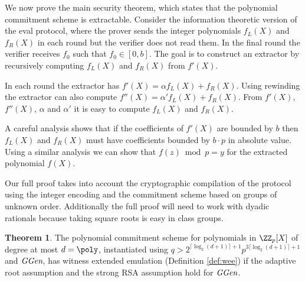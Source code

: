 \documentclass{article}
\theoremstyle{definition}
\newtheorem{theorem}{Theorem}
\begin{document}
We now prove the main security theorem, which states that the polynomial commitment scheme is extractable. Consider the information theoretic version of the eval protocol, where the prover sends the integer polynomials $f_L(X)$ and $f_R(X)$ in each round but the verifier does not read them. 
In the final round the verifier receives $f_0$ such that $f_0 \in [0,b]$. The goal is to construct an extractor by recursively computing $f_L(X)$ and $f_R(X)$ from $f'(X)$.

In each round the extractor has $f'(X)=\alpha f_L(X)+ f_R(X)$. Using rewinding the extractor can also compute $f''(X)=\alpha' f_L(X)+ f_R(X)$. From $f'(X)$, $f''(X)$, $\alpha$ and $\alpha'$ it is easy to compute $f_L(X)$ and $f_R(X)$.

A careful analysis shows that if the coefficients of $f'(X)$ are bounded by $b$ then $f_L(X)$ and $f_R(X)$ must have coefficients bounded by $b \cdot p$ in absolute value. Using a similar analysis we can show that $f(z)\bmod p=y$ for the extracted polynomial $f(X)$.

Our full proof takes into account the cryptographic compilation of the protocol using the integer encoding and the commitment scheme based on groups of unknown order. Additionally the full proof will need to work with dyadic rationals because taking square roots is easy in class groups.

\begin{theorem}
	The polynomial commitment scheme for polynomials in $\ZZ_p[X]$ of degree at most $d=\poly$, instantiated using $q>2^{\lceil \log_2(d+1) \rceil+1} p^{3 \lceil \log_2(d+1) \rceil+1}$ and $\textit{GGen}$, has witness extended emulation (Definition \ref{def:wee}) if the adaptive root assumption and the strong RSA assumption hold for $\textit{GGen}$.
\end{theorem}
\end{document}
